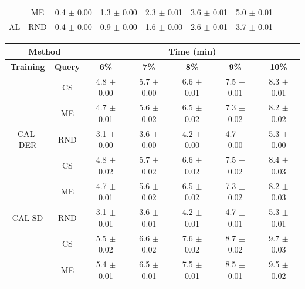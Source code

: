 \begin{table}[htbp]
\begin{tabular*}{\linewidth}{c|c|@{\extracolsep{\fill}}ccccc}
 & ME & 0.4 $\pm$ {\small 0.00} & 1.3 $\pm$ {\small 0.00} & 2.3 $\pm$ {\small 0.01} & 3.6 $\pm$ {\small 0.01} & 5.0 $\pm$ {\small 0.01}\\

\multirow{-3}{*}{\raggedright\arraybackslash AL} & RND & 0.4 $\pm$ {\small 0.00} & 0.9 $\pm$ {\small 0.00} & 1.6 $\pm$ {\small 0.00} & 2.6 $\pm$ {\small 0.01} & 3.7 $\pm$ {\small 0.01}\\
\bottomrule
\end{tabular*}
\vspace{0.5em}

\begin{tabular*}{\linewidth}{c|c|@{\extracolsep{\fill}}ccccc}
\toprule
\multicolumn{2}{c|}{\textbf{Method}} & \multicolumn{5}{c}{\textbf{Time (min)}} \\
\midrule
\textbf{Training} & \textbf{Query} & \textbf{6\%} & \textbf{7\%} & \textbf{8\%} & \textbf{9\%} & \textbf{10\%}\\
\midrule
 & CS & 4.8 $\pm$ {\small 0.00} & 5.7 $\pm$ {\small 0.00} & 6.6 $\pm$ {\small 0.01} & 7.5 $\pm$ {\small 0.01} & 8.3 $\pm$ {\small 0.01}\\

 & ME & 4.7 $\pm$ {\small 0.01} & 5.6 $\pm$ {\small 0.02} & 6.5 $\pm$ {\small 0.02} & 7.3 $\pm$ {\small 0.02} & 8.2 $\pm$ {\small 0.02}\\

\multirow{-3}{*}{\raggedright\arraybackslash CAL-DER} & RND & 3.1 $\pm$ {\small 0.00} & 3.6 $\pm$ {\small 0.00} & 4.2 $\pm$ {\small 0.00} & 4.7 $\pm$ {\small 0.00} & 5.3 $\pm$ {\small 0.00}\\
\midrule
 & CS & 4.8 $\pm$ {\small 0.02} & 5.7 $\pm$ {\small 0.02} & 6.6 $\pm$ {\small 0.02} & 7.5 $\pm$ {\small 0.02} & 8.4 $\pm$ {\small 0.03}\\

 & ME & 4.7 $\pm$ {\small 0.01} & 5.6 $\pm$ {\small 0.02} & 6.5 $\pm$ {\small 0.02} & 7.3 $\pm$ {\small 0.02} & 8.2 $\pm$ {\small 0.03}\\

\multirow{-3}{*}{\raggedright\arraybackslash CAL-SD} & RND & 3.1 $\pm$ {\small 0.01} & 3.6 $\pm$ {\small 0.01} & 4.2 $\pm$ {\small 0.01} & 4.7 $\pm$ {\small 0.01} & 5.3 $\pm$ {\small 0.01}\\
\midrule
 & CS & 5.5 $\pm$ {\small 0.02} & 6.6 $\pm$ {\small 0.02} & 7.6 $\pm$ {\small 0.02} & 8.7 $\pm$ {\small 0.02} & 9.7 $\pm$ {\small 0.03}\\

 & ME & 5.4 $\pm$ {\small 0.01} & 6.5 $\pm$ {\small 0.01} & 7.5 $\pm$ {\small 0.01} & 8.5 $\pm$ {\small 0.01} & 9.5 $\pm$ {\small 0.02}\\


\end{tabular*}
\end{table}
